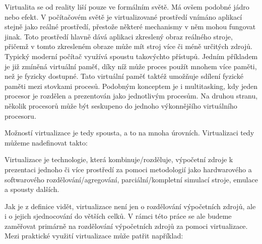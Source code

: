 Virtualita se od reality liší pouze ve formálním světě. Má ovšem podobné jádro nebo efekt. V počítačovém světě je virtualizované prostředí vnímáno aplikací stejně jako reálné prostředí, přestože některé mechanismy v něm mohou fungovat jinak. Toto prostředí hlavně dává aplikaci zkreslený obraz reálného stroje, přičemž v tomto zkresleném obraze může mít stroj více či méně určitých zdrojů. Typický moderní počítač využívá spoustu takovýchto přístupů. Jedním příkladem je již zmíněná virtuální paměť, díky níž může proces použít mnohem více paměti, než je fyzicky dostupné. Tato virtuální paměť taktéž umožňuje sdílení fyzické paměti mezi stovkami procesů. Podobným konceptem je i multitasking, kdy jeden procesor je rozdělen a prezentován jako  jednotlivým procesům. Na druhou stranu, několik procesorů může být seskupeno do jednoho výkonnějšího virtuálního procesoru.\,\cite{chiueh2005survey}

Možností virtualizace je tedy spousta, a to na mnoha úrovních. Virtualizaci tedy můžeme nadefinovat takto:

\begin{displayquote}
    Virtualizace je technologie, která kombinuje/rozděluje, výpočetní zdroje k prezentaci jednoho či více prostředí za pomoci metodologií jako hardwarového a softwarového rozdělování/agregování, parciální/kompletní simulací stroje, emulace a spousty dalších.\,\cite{chiueh2005survey}
\end{displayquote}

Jak je z definice vidět, virtualizace není jen o rozdělování výpočetních zdrojů, ale i o jejich sjednocování do větších celků. V rámci této práce se ale budeme zaměřovat primárně na rozdělování výpočetních zdrojů za pomoci virtualizace. Mezi praktické využití virtualizace může patřit například:


